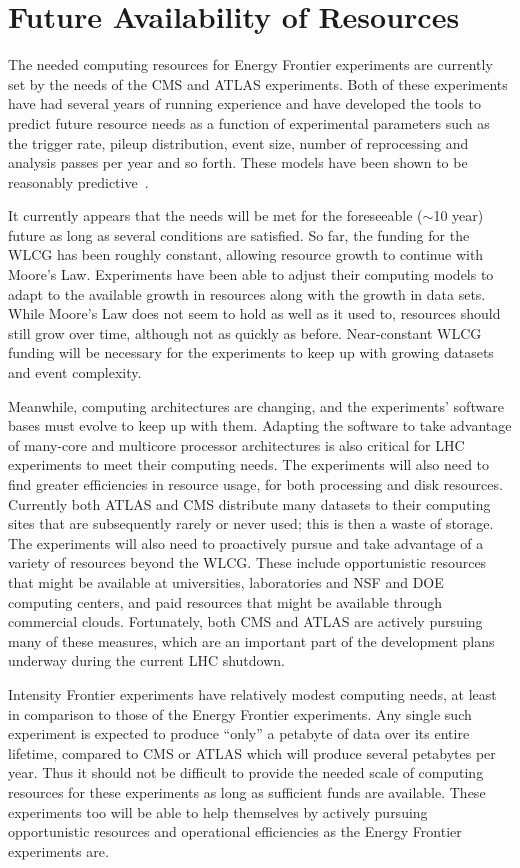  
\section{Future Availability of Resources}


The needed computing resources for Energy Frontier experiments are currently set by the needs of the CMS and ATLAS experiments.  Both of these experiments have had several years of running experience and have developed the tools to predict future resource needs as a function of experimental parameters such as the trigger rate, pileup distribution, event size, number of reprocessing and analysis passes per year and so forth.  These models have been shown to be reasonably predictive~\cite{bib:CHEPresources}.

It currently appears that the needs will be met for the foreseeable ($\sim$10 year) future as long as several conditions are satisfied.  So far, the funding for the WLCG has been roughly constant, allowing resource growth to continue with Moore's Law.  Experiments have been able to adjust their computing models to adapt to the available growth in resources along with the growth in data sets.  While Moore's Law does not seem to hold as well as it used to, resources should still grow over time, although not as quickly as before.  Near-constant WLCG funding will be necessary for the experiments to keep up with growing datasets and event complexity.  

Meanwhile, computing architectures are changing, and the experiments' software bases must evolve to keep up with them.  Adapting the software to take advantage of many-core and multicore processor architectures is also critical for LHC experiments to meet their computing needs.  The experiments will also need to find greater efficiencies in resource usage, for both processing and disk resources.  Currently both ATLAS and CMS distribute many datasets to their computing sites that are subsequently rarely or never used; this is then a waste of storage.  The experiments will also need to proactively pursue and take advantage of a variety of resources beyond the WLCG.  These include opportunistic resources that might be available at universities, laboratories and NSF and DOE computing centers, and paid resources that might be available through commercial clouds.  Fortunately, both CMS and ATLAS are actively pursuing many of these measures, which are an important part of the development plans underway during the current LHC shutdown.

Intensity Frontier experiments have relatively modest computing needs, at least in comparison to those of the Energy Frontier experiments.  Any single such experiment is expected to produce “only” a petabyte of data over its entire lifetime, compared to CMS or ATLAS which will produce several petabytes per year.  Thus it should not be difficult to provide the needed scale of computing resources for these experiments as long as sufficient funds are available.  These experiments too will be able to help themselves by actively pursuing opportunistic resources and operational efficiencies as the Energy Frontier experiments are.

